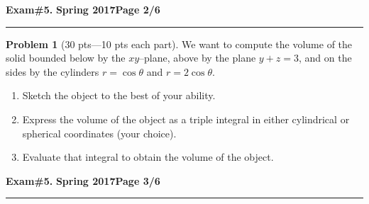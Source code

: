 \documentclass[12pt]{article}
\theoremstyle{definition}
\newtheorem{problem}{Problem}
\begin{document}
\hfill{\large\bf Exam\#5.}\hfill{\large\bf
  Spring 2017}\hfill{\large\bf Page 2/6}\hrule

\bigskip
\begin{problem}[30 pts---10 pts each part]
We want to compute the volume of the solid bounded below by the $xy$--plane, above by the plane $y+z=3$, and on the sides by the cylinders $r=\cos\theta$ and $r=2 \cos\theta$.  
\begin{enumerate}
\item Sketch the object to the best of your ability.
\vspace{5cm}
\item Express the volume of the object as a triple integral in either cylindrical or spherical coordinates (your choice).
\vspace{5cm}
\begin{flushright}
\end{flushright}
\item Evaluate that integral to obtain the volume of the object.
\vspace{5cm}
\begin{flushright}
\end{flushright}
\end{enumerate}
\end{problem}

\newpage

\hfill{\large\bf Exam\#5.}\hfill{\large\bf
  Spring 2017}\hfill{\large\bf Page 3/6}\hrule
\end{document}
